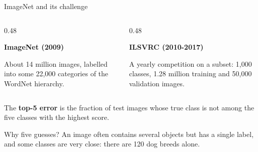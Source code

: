 \documentclass[11pt,aspectratio=169]{beamer}
\begin{document}
\begin{frame}{ImageNet and its challenge}

    \begin{columns}[T,onlytextwidth]
        \begin{column}{0.48\textwidth}
            \begin{tcolorbox}[nndsblue,courseheight={imagenet}{}]
                \textbf{ImageNet (2009)}

                About 14 million images, labelled into some 22,000
                categories of the WordNet hierarchy.
            \end{tcolorbox}
        \end{column}
        \begin{column}{0.48\textwidth}
            \begin{tcolorbox}[nndsred,courseheight={imagenet}{}]
                \textbf{ILSVRC (2010-2017)}

                A yearly competition on a subset: 1,000 classes, 1.28 million
                training and 50,000 validation images.
            \end{tcolorbox}
        \end{column}
    \end{columns}

    \medskip
    \begin{tcolorbox}[nndsgreen]
        The \textbf{top-5 error} is the fraction of test images whose true
        class is not among the five classes with the highest score.
    \end{tcolorbox}

    \medskip
    Why five guesses? An image often contains several objects but has a
    single label, and some classes are very close: there are 120 dog breeds
    alone.


\end{frame}
\end{document}
